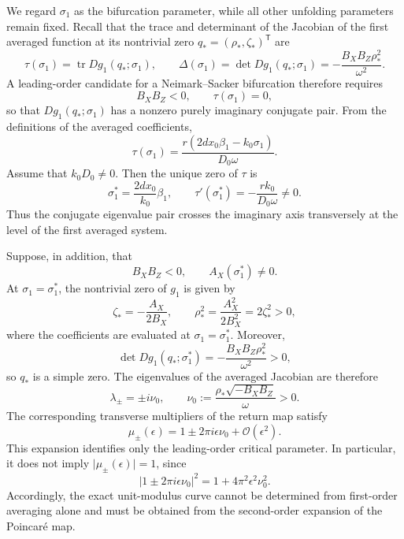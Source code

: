 \documentclass[11pt]{amsart}
\theoremstyle{remark}
\newcommand{\tr}{\operatorname{tr}}
\newcommand{\cO}{\mathcal{O}}
\begin{document}
We regard \(\sigma_1\) as the bifurcation parameter, while all other
unfolding parameters remain fixed.  Recall that the trace and determinant of
the Jacobian of the first averaged function at its nontrivial zero
\(q_*=(\rho_*,\zeta_*)^{\mathsf T}\) are
\[
 \tau(\sigma_1)=\tr Dg_1(q_*;\sigma_1),
 \qquad
 \Delta(\sigma_1)=\det Dg_1(q_*;\sigma_1)
 =-\frac{B_XB_Z\rho_*^2}{\omega^2}.
\]
A leading-order candidate for a Neimark--Sacker bifurcation therefore
requires
\[
 B_XB_Z<0,\qquad \tau(\sigma_1)=0,
\]
so that \(Dg_1(q_*;\sigma_1)\) has a nonzero purely imaginary conjugate pair.
From the definitions of the averaged coefficients,
\begin{equation}\label{eq:tau-sigma}
 \tau(\sigma_1)
 =\frac{r(2dx_0\beta_1-k_0\sigma_1)}{D_0\omega}.
\end{equation}
Assume that \(k_0D_0\ne0\).  Then the unique zero of \(\tau\) is
\begin{equation}\label{eq:tau-zero}
 \sigma_1^*=\frac{2dx_0}{k_0}\beta_1,
 \qquad
 \tau'(\sigma_1^*)=-\frac{rk_0}{D_0\omega}\ne0.
\end{equation}
Thus the conjugate eigenvalue pair crosses the imaginary axis transversely
at the level of the first averaged system.

Suppose, in addition, that
\[
 B_XB_Z<0,\qquad A_X(\sigma_1^*)\ne0.
\]
At \(\sigma_1=\sigma_1^*\), the nontrivial zero of \(g_1\) is given by
\begin{equation}\label{eq:critical-averaged-zero}
 \zeta_*=-\frac{A_X}{2B_X},
 \qquad
 \rho_*^2=\frac{A_X^2}{2B_X^2}=2\zeta_*^2>0,
\end{equation}
where the coefficients are evaluated at \(\sigma_1=\sigma_1^*\).  Moreover,
\[
 \det Dg_1(q_*;\sigma_1^*)
 =-\frac{B_XB_Z\rho_*^2}{\omega^2}>0,
\]
so \(q_*\) is a simple zero.  The eigenvalues of the averaged Jacobian are
therefore
\begin{equation}\label{eq:averaged-eigenvalues}
 \lambda_\pm=\pm i\nu_0,
 \qquad
 \nu_0:=\frac{\rho_*\sqrt{-B_XB_Z}}{\omega}>0.
\end{equation}
The corresponding transverse multipliers of the return map satisfy
\begin{equation}\label{eq:multiplier-leading}
 \mu_\pm(\epsilon)=1\pm2\pi i\epsilon\nu_0+\cO(\epsilon^2).
\end{equation}
This expansion identifies only the leading-order critical parameter.  In
particular, it does not imply \(\lvert\mu_\pm(\epsilon)\rvert=1\), since
\[
 \lvert1\pm2\pi i\epsilon\nu_0\rvert^2
 =1+4\pi^2\epsilon^2\nu_0^2.
\]
Accordingly, the exact unit-modulus curve cannot be determined from
first-order averaging alone and must be obtained from the second-order
expansion of the Poincar\'e map.
\end{document}
